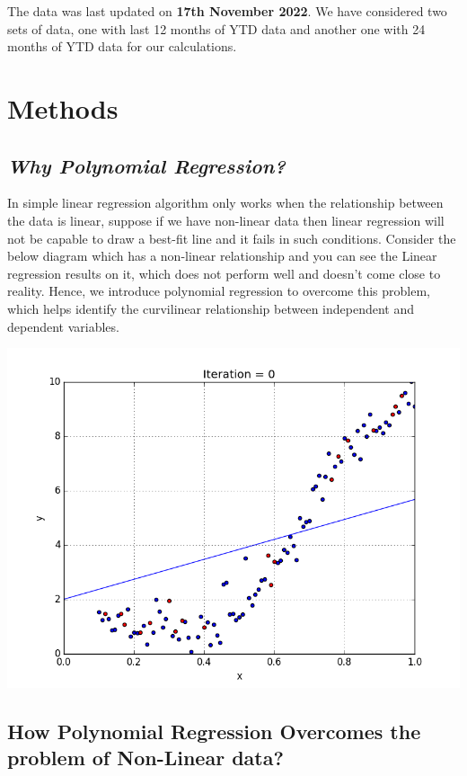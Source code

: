 \documentclass[
  letterpaper,
  DIV=11,
  numbers=noendperiod]{scrreport}
\begin{document}
\begin{enumerate}
  The data was last updated on \textbf{17th November 2022}. We have
  considered two sets of data, one with last 12 months of YTD data and
  another one with 24 months of YTD data for our calculations.
\end{enumerate}

\hypertarget{methods}{%
\section{Methods}\label{methods}}

\hypertarget{why-polynomial-regression}{%
\subsection{\texorpdfstring{\emph{Why Polynomial
Regression?}}{Why Polynomial Regression?}}\label{why-polynomial-regression}}

In simple linear regression algorithm only works when the relationship
between the data is linear, suppose if we have non-linear data then
linear regression will not be capable to draw a best-fit line and it
fails in such conditions. Consider the below diagram which has a
non-linear relationship and you can see the Linear regression results on
it, which does not perform well and doesn't come close to reality.
Hence, we introduce polynomial regression to overcome this problem,
which helps identify the curvilinear relationship between independent
and dependent variables.

\includegraphics{./images/1_7w8mfB_Ecfr0x76Vc7qang.gif}

\hypertarget{how-polynomial-regression-overcomes-the-problem-of-non-linear-data}{%
\subsection{\texorpdfstring{\textbf{How Polynomial Regression Overcomes
the problem of Non-Linear
data?}}{How Polynomial Regression Overcomes the problem of Non-Linear data?}}\label{how-polynomial-regression-overcomes-the-problem-of-non-linear-data}}
\end{document}
